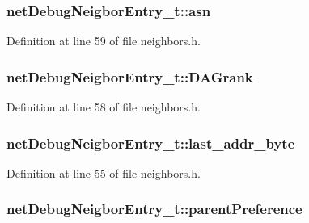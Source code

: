 \subsubsection[{\texorpdfstring{asn}{asn}}]{ net\+Debug\+Neigbor\+Entry\+\_\+t\+::asn}\hypertarget{structnet_debug_neigbor_entry__t_a165b554d93490830877a8866318aea04}{}\label{structnet_debug_neigbor_entry__t_a165b554d93490830877a8866318aea04}


Definition at line 59 of file neighbors.\+h.

\subsubsection[{\texorpdfstring{D\+A\+Grank}{DAGrank}}]{ net\+Debug\+Neigbor\+Entry\+\_\+t\+::\+D\+A\+Grank}\hypertarget{structnet_debug_neigbor_entry__t_a598ec07b40276860d689e9c792422881}{}\label{structnet_debug_neigbor_entry__t_a598ec07b40276860d689e9c792422881}


Definition at line 58 of file neighbors.\+h.

\subsubsection[{\texorpdfstring{last\+\_\+addr\+\_\+byte}{last_addr_byte}}]{ net\+Debug\+Neigbor\+Entry\+\_\+t\+::last\+\_\+addr\+\_\+byte}\hypertarget{structnet_debug_neigbor_entry__t_a40f416cf939cf5afff5a93f33f59a5c5}{}\label{structnet_debug_neigbor_entry__t_a40f416cf939cf5afff5a93f33f59a5c5}


Definition at line 55 of file neighbors.\+h.

\subsubsection[{\texorpdfstring{parent\+Preference}{parentPreference}}]{ net\+Debug\+Neigbor\+Entry\+\_\+t\+::parent\+Preference}\hypertarget{structnet_debug_neigbor_entry__t_a091ad78edf8df0476cbf0cd40628b1b1}{}\label{structnet_debug_neigbor_entry__t_a091ad78edf8df0476cbf0cd40628b1b1}


